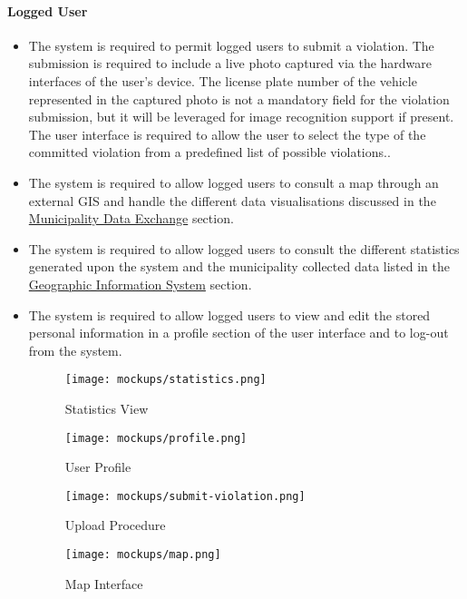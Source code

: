 \newpage\paragraph{Logged User}
	\begin{itemize}
		\item The system is required to permit logged users to submit a violation. The submission is required to include a live photo captured via the hardware interfaces of the user's device. The license plate number of the vehicle represented in the captured photo is not a mandatory field for the violation submission, but it will be leveraged for image recognition support if present. The user interface is required to allow the user to select the type of the committed violation from a predefined list of possible violations..			
		
		\item The system is required to allow logged users to consult a map through an external GIS and handle the different data visualisations discussed in the \hyperref[p:mde]{Municipality Data Exchange} section.
					 
			
			
		\item The system is required to allow logged users to consult the different statistics generated upon the system and the municipality collected data listed in the \hyperref[p:mde]{Geographic Information System} section.
		\item The system is required to allow logged users to view and edit the stored personal information in a profile section of the user interface and to log-out from the system. \newline\newline
			
			\begin{figure}[h]
  				\centering
  				\begin{minipage}[b]{0.4\textwidth}
    				\texttt{[image: mockups/statistics.png]}
    					\caption{Statistics View}
  				\end{minipage}
  				\hfill
  				\begin{minipage}[b]{0.4\textwidth}
    				\texttt{[image: mockups/profile.png]}
    				\caption{User Profile}
  				\end{minipage}
			\end{figure}
			
			\begin{figure}[h]
  				\centering
  				\begin{minipage}[b]{0.4\textwidth}
    				\texttt{[image: mockups/submit-violation.png]}
    					\caption{Upload Procedure}
  				\end{minipage}
  				\hfill
  				\begin{minipage}[b]{0.4\textwidth}
    				\texttt{[image: mockups/map.png]}
    				\caption{Map Interface}
  				\end{minipage}
			\end{figure}
	\end{itemize}

